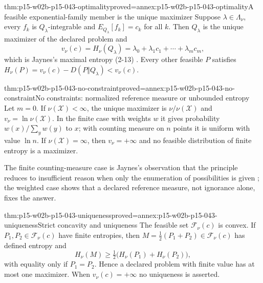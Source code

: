 \begin{hbtheorem}{thm:p15-w02b-p15-043-optimality}{proved=annex:p15-w02b-p15-043-optimality}{A feasible exponential-family member is the unique maximizer}
Suppose \(\lambda\in\Lambda_\nu\), every \(f_k\) is \(Q_\lambda\)-integrable
and \(E_{Q_\lambda}[f_k]=c_k\) for all \(k\). Then \(Q_\lambda\) is the
unique maximizer of the declared problem and
\[
 v_\nu(c)=H_\nu(Q_\lambda)=\lambda_0+\lambda_1c_1+\cdots+\lambda_mc_m ,
\]
which is Jaynes's maximal entropy (2-13)
\cite[p.~623]{Jaynes1957InformationTheory}. Every other feasible \(P\)
satisfies \(H_\nu(P)=v_\nu(c)-D(P\Vert Q_\lambda)<v_\nu(c)\).
\end{hbtheorem}

\begin{hbcorollary}{thm:p15-w02b-p15-043-no-constraint}{proved=annex:p15-w02b-p15-043-no-constraint}{No constraints: normalized reference measure or unbounded entropy}
Let \(m=0\). If \(\nu(\mathcal X)<\infty\), the unique maximizer is
\(\nu/\nu(\mathcal X)\) and \(v_\nu=\ln\nu(\mathcal X)\). In the finite
case with weights \(w\) it gives probability \(w(x)/\sum_yw(y)\) to \(x\);
with counting measure on \(n\) points it is uniform with value \(\ln n\).
If \(\nu(\mathcal X)=\infty\), then \(v_\nu=+\infty\) and no feasible
distribution of finite entropy is a maximizer.
\end{hbcorollary}

The finite counting-measure case is Jaynes's observation that the principle
reduces to insufficient reason when only the enumeration of possibilities is
given \cite[p.~623]{Jaynes1957InformationTheory}; the weighted case shows
that a declared reference measure, not ignorance alone, fixes the answer.

\begin{hbtheorem}{thm:p15-w02b-p15-043-uniqueness}{proved=annex:p15-w02b-p15-043-uniqueness}{Strict concavity and uniqueness}
The feasible set \(\mathcal F_\nu(c)\) is convex. If
\(P_1,P_2\in\mathcal F_\nu(c)\) have finite entropies, then
\(M=\tfrac12(P_1+P_2)\in\mathcal F_\nu(c)\) has defined entropy and
\[
 H_\nu(M)\geq\tfrac12\bigl(H_\nu(P_1)+H_\nu(P_2)\bigr),
\]
with equality only if \(P_1=P_2\). Hence a declared problem with finite
value has at most one maximizer. When \(v_\nu(c)=+\infty\) no uniqueness
is asserted.
\end{hbtheorem}

